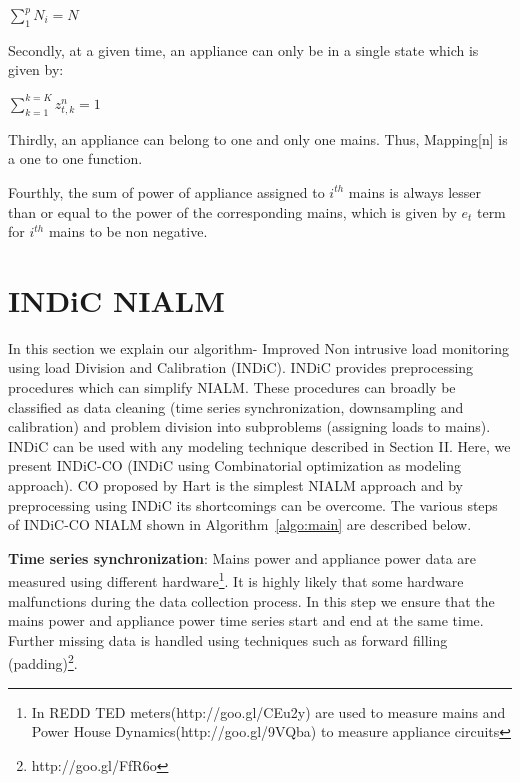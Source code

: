 \documentclass[conference]{IEEEtran}
\newcommand{\algoref}[1]{Algorithm~\ref{#1}}
\newcommand{\indic}{INDiC}
\begin{document}
 $\sum\limits_{1}^{p}{N_i}=N$

\noindent Secondly, at a given time, an appliance can only be in a single state which is given by:

 $\sum\limits_{k=1}^{k=K} z_{t,k}^n=1$ 

\noindent Thirdly, an appliance can belong to one and only one mains. Thus, Mapping[n] is a one to one function.

\noindent Fourthly, the sum of power of appliance assigned to $i^{th}$ mains is always lesser than or equal to the power of the corresponding mains, which is given by $e_t$ term for $i^{th}$ mains to be non negative.




\section{INDiC NIALM}
\noindent In this section we explain our algorithm- Improved Non intrusive load monitoring using load Division and Calibration (\indic). INDiC provides preprocessing procedures which can simplify NIALM. These procedures can broadly be classified as data cleaning (time series synchronization, downsampling and calibration) and problem division into subproblems (assigning loads to mains). INDiC can be used with any modeling technique described in Section II. Here, we present INDiC-CO (INDiC using Combinatorial optimization as modeling approach). CO proposed by Hart\cite{hart} is the simplest NIALM approach and by preprocessing using INDiC its shortcomings can be overcome. The various steps of INDiC-CO NIALM shown in \algoref{algo:main} are described below. 

\noindent\textbf{Time series synchronization}: Mains power and appliance power data are measured using different hardware\footnote{In REDD\cite{redd} TED meters(http://goo.gl/CEu2y) are used to measure mains and Power House Dynamics(http://goo.gl/9VQba) to measure appliance circuits}. It is highly likely that some hardware malfunctions during the data collection process. In this step we ensure that the mains power and appliance power time series start and end at the same time. Further missing data is handled using techniques such as forward filling (padding)\footnote{http://goo.gl/FfR6o}.
\end{document}
